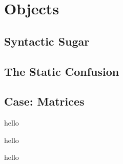 \chapter{Objects}




\section{Syntactic Sugar}



\section{The Static Confusion}



\section{Case: Matrices}

\csharpsection{\csharp}
hello

hello

hello

